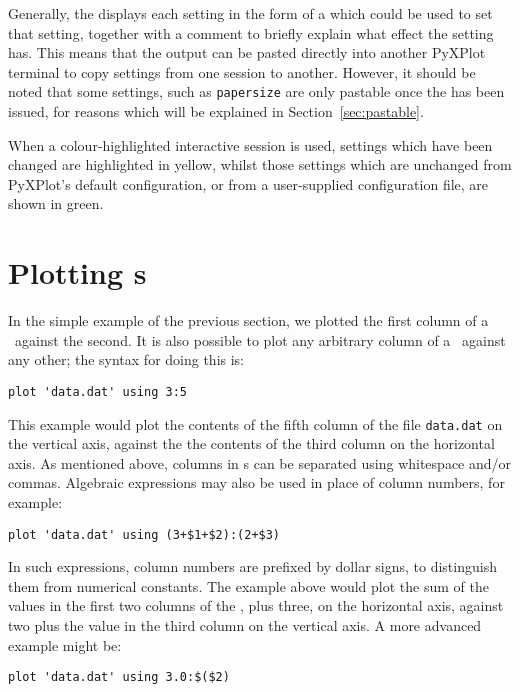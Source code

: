 Generally, the  displays each setting in the form of a
 which could be used to set that setting, together with a comment
to briefly explain what effect the setting has. This means that the output can
be pasted directly into another PyXPlot terminal to copy settings from one
session to another. However, it should be noted that some settings, such as
{\tt papersize} are only pastable once the  has
been issued, for reasons which will be explained in Section~\ref{sec:pastable}.

When a colour-highlighted interactive session is used, settings which have been
changed are highlighted in yellow, whilst those settings which are unchanged
from PyXPlot's default configuration, or from a user-supplied configuration
file, are shown in green.

\section{Plotting \Datafile s}
\label{sec:plot_datafiles}

In the simple example of the previous section, we plotted the first column of a
\datafile\ against the second. It is also possible to plot any arbitrary column
of a \datafile\ against any other; the syntax for doing this is:

\begin{verbatim}
plot 'data.dat' using 3:5
\end{verbatim}

\noindent This example would plot the contents of the fifth column of the file
{\tt data.dat} on the vertical axis, against the the contents of the third
column on the horizontal axis. As mentioned above, columns in \datafile s can be
separated using whitespace and/or commas.  Algebraic expressions may also be
used in place of column numbers, for example:

\begin{verbatim}
plot 'data.dat' using (3+$1+$2):(2+$3)
\end{verbatim}

\noindent In such expressions, column numbers are prefixed by dollar signs, to
distinguish them from numerical constants. The example above would plot the sum
of the values in the first two columns of the \datafile, plus three, on the
horizontal axis, against two plus the value in the third column on the vertical
axis. A more advanced example might be:

\begin{verbatim}
plot 'data.dat' using 3.0:$($2)
\end{verbatim}

